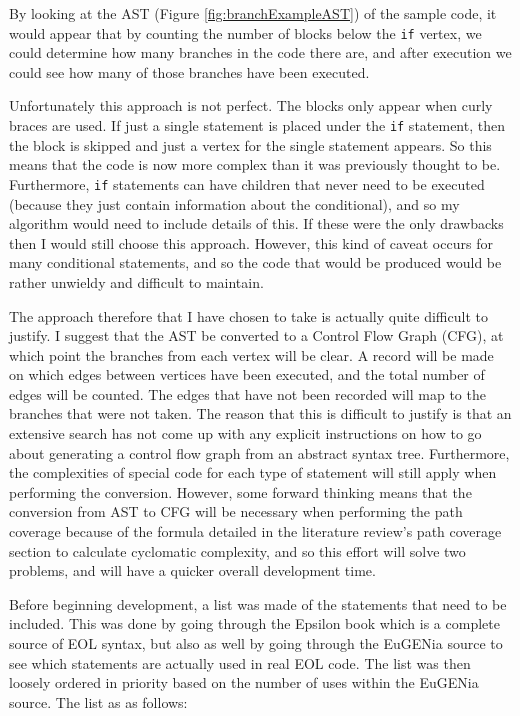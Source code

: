 By looking at the AST (Figure \ref{fig:branchExampleAST}) of the sample code, it would appear that by counting the number of blocks below the \verb|if| vertex, we could determine how many branches in the code there are, and after execution we could see how many of those branches have been executed.

Unfortunately this approach is not perfect. The blocks only appear when curly braces are used. If just a single statement is placed under the \verb|if| statement, then the block is skipped and just a vertex for the single statement appears. So this means that the code is now more complex than it was previously thought to be. Furthermore, \verb|if| statements can have children that never need to be executed (because they just contain information about the conditional), and so my algorithm would need to include details of this. If these were the only drawbacks then I would still choose this approach. However, this kind of caveat occurs for many conditional statements, and so the code that would be produced would be rather unwieldy and difficult to maintain.

The approach therefore that I have chosen to take is actually quite difficult to justify. I suggest that the AST be converted to a Control Flow Graph (CFG), at which point the branches from each vertex will be clear. A record will be made on which edges between vertices have been executed, and the total number of edges will be counted. The edges that have not been recorded will map to the branches that were not taken. The reason that this is difficult to justify is that an extensive search has not come up with any explicit instructions on how to go about generating a control flow graph from an abstract syntax tree. Furthermore, the complexities of special code for each type of statement will still apply when performing the conversion. However, some forward thinking means that the conversion from AST to CFG will be necessary when performing the path coverage because of the formula detailed in the literature review's path coverage section to calculate cyclomatic complexity, and so this effort will solve two problems, and will have a quicker overall development time.

Before beginning development, a list was made of the statements that need to be included. This was done by going through the Epsilon book \citep{epsilonBook} which is a complete source of EOL syntax, but also as well by going through the EuGENia source to see which statements are actually used in real EOL code. The list was then loosely ordered in priority based on the number of uses within the EuGENia source. The list as as follows:

